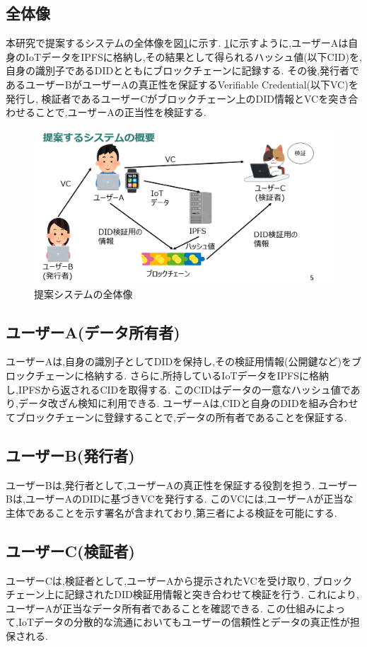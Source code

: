 \documentclass[a4paper,9pt,twocolumn]{ltjsarticle} %
\begin{document}
\subsection{全体像}
本研究で提案するシステムの全体像を図\ref{fig:system-overview}に示す.
\ref{fig:system-overview}に示すように,ユーザーAは自身のIoTデータをIPFSに格納し,その結果として得られるハッシュ値(以下CID)を,
自身の識別子であるDIDとともにブロックチェーンに記録する.
その後,発行者であるユーザーBがユーザーAの真正性を保証するVerifiable Credential(以下VC)を発行し,
検証者であるユーザーCがブロックチェーン上のDID情報とVCを突き合わせることで,ユーザーAの正当性を検証する.

\begin{figure}[H]
  \centering
  \includegraphics[width=0.9\linewidth]{figure1.png}
  \caption{提案システムの全体像}
  \label{fig:system-overview}
\end{figure}

\subsection{ユーザーA(データ所有者)}
ユーザーAは,自身の識別子としてDIDを保持し,その検証用情報(公開鍵など)をブロックチェーンに格納する.
さらに,所持しているIoTデータをIPFSに格納し,IPFSから返されるCIDを取得する.
このCIDはデータの一意なハッシュ値であり,データ改ざん検知に利用できる.
ユーザーAは,CIDと自身のDIDを組み合わせてブロックチェーンに登録することで,データの所有者であることを保証する.

\subsection{ユーザーB(発行者)}
ユーザーBは,発行者として,ユーザーAの真正性を保証する役割を担う.
ユーザーBは,ユーザーAのDIDに基づきVCを発行する.
このVCには,ユーザーAが正当な主体であることを示す署名が含まれており,第三者による検証を可能にする.

\subsection{ユーザーC(検証者)}
ユーザーCは,検証者として,ユーザーAから提示されたVCを受け取り,
ブロックチェーン上に記録されたDID検証用情報と突き合わせて検証を行う.
これにより,ユーザーAが正当なデータ所有者であることを確認できる.
この仕組みによって,IoTデータの分散的な流通においてもユーザーの信頼性とデータの真正性が担保される.
\end{document}
